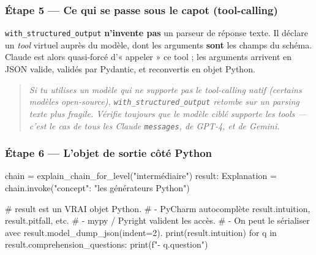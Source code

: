 \documentclass[11pt,a4paper]{article}
\begin{document}
\subsubsection*{Étape 5 — Ce qui se passe sous le capot (tool-calling)}

\begin{center}
\end{center}

\texttt{with\_structured\_output} \textbf{n'invente pas} un parseur de
réponse texte. Il déclare un \emph{tool} virtuel auprès du modèle, dont les
arguments \textbf{sont} les champs du schéma. Claude est alors quasi-forcé
d'« appeler » ce tool ; les arguments arrivent en JSON valide, validés par
Pydantic, et reconvertis en objet Python.

\begin{quote}\itshape
Si tu utilises un modèle qui \emph{ne supporte pas} le tool-calling natif
(certains modèles open-source), \texttt{with\_structured\_output} retombe
sur un parsing texte plus fragile. Vérifie toujours que le modèle ciblé
supporte les tools — c'est le cas de tous les Claude \texttt{messages}, de
GPT-4, et de Gemini.
\end{quote}

\subsubsection*{Étape 6 — L'objet de sortie côté Python}

\begin{pythoncode}
chain = explain_chain_for_level("intermédiaire")
result: Explanation = chain.invoke({"concept": "les générateurs Python"})

# result est un VRAI objet Python.
# - PyCharm autocomplète result.intuition, result.pitfall, etc.
# - mypy / Pyright valident les accès.
# - On peut le sérialiser avec result.model_dump_json(indent=2).
print(result.intuition)
for q in result.comprehension_questions:
    print(f"- {q.question}")
\end{pythoncode}
\end{document}
